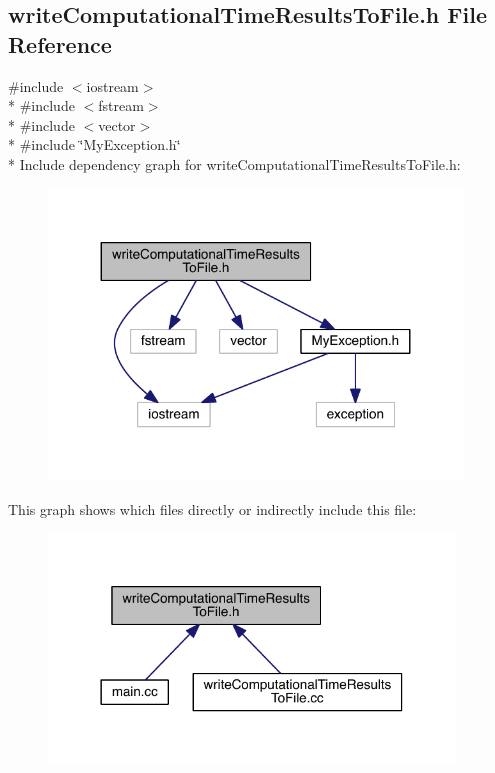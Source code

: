 \hypertarget{a00116}{}\subsection{write\+Computational\+Time\+Results\+To\+File.\+h File Reference}
\label{a00116}
{\ttfamily \#include $<$iostream$>$}\\*
{\ttfamily \#include $<$fstream$>$}\\*
{\ttfamily \#include $<$vector$>$}\\*
{\ttfamily \#include \char`\"{}My\+Exception.\+h\char`\"{}}\\*
Include dependency graph for write\+Computational\+Time\+Results\+To\+File.\+h\+:\nopagebreak
\begin{figure}[H]
\begin{center}
\leavevmode
\includegraphics[width=311pt]{a00152}
\end{center}
\end{figure}
This graph shows which files directly or indirectly include this file\+:\nopagebreak
\begin{figure}[H]
\begin{center}
\leavevmode
\includegraphics[width=306pt]{a00153}
\end{center}
\end{figure}
